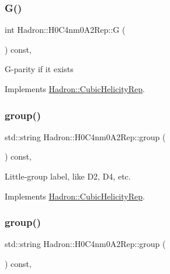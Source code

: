 \subsubsection{\texorpdfstring{G()}{G()}\hspace{0.1cm}{\footnotesize\ttfamily [3/3]}}
{\footnotesize\ttfamily int Hadron\+::\+H0\+C4nm0\+A2\+Rep\+::G (\begin{DoxyParamCaption}{ }\end{DoxyParamCaption}) const\hspace{0.3cm}{\ttfamily [inline]}, {\ttfamily [virtual]}}

G-\/parity if it exists 

Implements \mbox{\hyperlink{structHadron_1_1CubicHelicityRep_a50689f42be1e6170aa8cf6ad0597018b}{Hadron\+::\+Cubic\+Helicity\+Rep}}.

\mbox{\label{structHadron_1_1H0C4nm0A2Rep_aef42f0970df5b016741ddfeccf659871}} 
\subsubsection{\texorpdfstring{group()}{group()}\hspace{0.1cm}{\footnotesize\ttfamily [1/5]}}
{\footnotesize\ttfamily std\+::string Hadron\+::\+H0\+C4nm0\+A2\+Rep\+::group (\begin{DoxyParamCaption}{ }\end{DoxyParamCaption}) const\hspace{0.3cm}{\ttfamily [inline]}, {\ttfamily [virtual]}}

Little-\/group label, like D2, D4, etc. 

Implements \mbox{\hyperlink{structHadron_1_1CubicHelicityRep_a101a7d76cd8ccdad0f272db44b766113}{Hadron\+::\+Cubic\+Helicity\+Rep}}.

\mbox{\label{structHadron_1_1H0C4nm0A2Rep_aef42f0970df5b016741ddfeccf659871}} 
\subsubsection{\texorpdfstring{group()}{group()}\hspace{0.1cm}{\footnotesize\ttfamily [2/5]}}
{\footnotesize\ttfamily std\+::string Hadron\+::\+H0\+C4nm0\+A2\+Rep\+::group (\begin{DoxyParamCaption}{ }\end{DoxyParamCaption}) const\hspace{0.3cm}{\ttfamily [inline]}, {\ttfamily [virtual]}}

